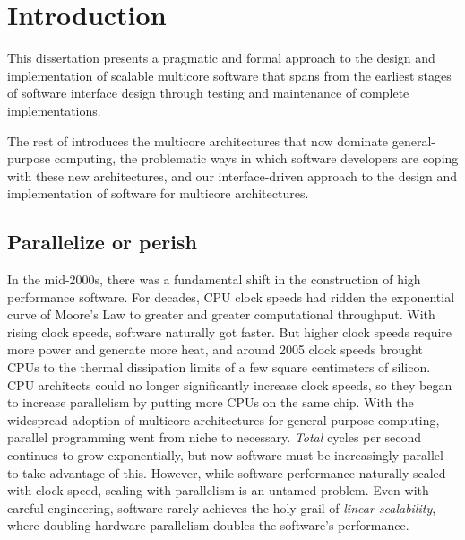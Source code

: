 \section{Introduction}
\label{sec:intro}



This dissertation presents a pragmatic and formal approach to the
design and implementation of scalable multicore software that spans
from the earliest stages of software interface design through
testing and maintenance of complete implementations.

The rest of  introduces the multicore
architectures that now dominate general-purpose computing, the
problematic ways in which software developers are coping with these
new architectures, and our interface-driven approach to the design and
implementation of software for multicore architectures.


\subsection{Parallelize or perish}

In the mid-2000s, there was a fundamental shift in the construction of
high performance software.  For decades, CPU clock speeds had ridden
the exponential curve of Moore's Law to greater and greater
computational throughput.  With rising clock speeds, software
naturally got faster.
%
But higher clock speeds require more power and generate more heat, and
around 2005 clock speeds brought CPUs to the thermal dissipation
limits of a few square centimeters of silicon.
%
CPU architects could no longer significantly increase clock speeds, so
they began to increase parallelism by putting more CPUs on the same
chip.
%
With the widespread adoption of multicore architectures for
general-purpose computing, parallel programming went from niche to
necessary.
%
\emph{Total} cycles per second continues to grow exponentially, but
now software must be increasingly parallel to take advantage of this.
%
However, while software performance naturally scaled with clock speed,
scaling with parallelism is an untamed problem.  Even with careful
engineering, software rarely achieves the holy grail of \emph{linear
  scalability}, where doubling hardware parallelism doubles the
software's performance.

